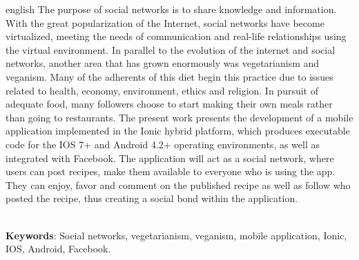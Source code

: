 \begin{resumo}[Abstract]			%
\begin{otherlanguage*}{english}		%
  The purpose of social networks is to share knowledge and information. With the great popularization of the Internet, social networks have become virtualized, meeting the needs of communication and real-life relationships using the virtual environment. In parallel to the evolution of the internet and social networks, another area that has grown enormously was vegetarianism and veganism. Many of the adherents of this diet begin this practice due to issues related to health, economy, environment, ethics and religion. In pursuit of adequate food, many followers choose to start making their own meals rather than going to restaurants. The present work presents the development of a mobile application implemented in the Ionic hybrid platform, which produces executable code for the IOS 7+ and Android 4.2+ operating environments, as well as integrated with Facebook. The application will act as a social network, where users can post recipes, make them available to everyone who is using the app. They can enjoy, favor and comment on the published recipe as well as follow who posted the recipe, thus creating a social bond within the application.
  
\vspace{\onelineskip}
\noindent\\
\textbf{Keywords}: Social networks, vegetarianism, veganism, mobile application, Ionic, IOS, Android, Facebook.
\end{otherlanguage*}
\end{resumo}

% 

%  
